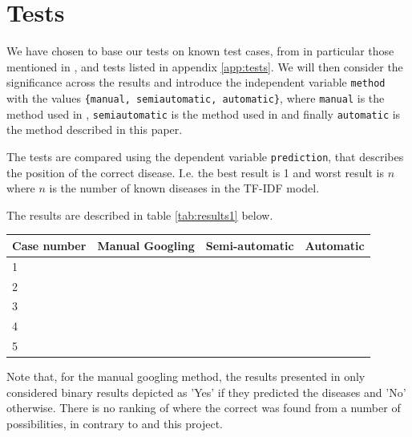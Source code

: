 \documentclass[10pt,letterpaper,final]{article}
\begin{document}


\section{Tests}
We have chosen to base our tests on known test cases, from in particular
those mentioned in \cite{jensenandersen}, \cite{googlingdiagnosis} and
tests listed in appendix \ref{app:tests}. We will then consider the
significance across the results and introduce the independent variable
\texttt{method} with the values \texttt{\{manual, semiautomatic,
automatic\}}, where \texttt{manual} is the method used in
\cite{googlingdiagnosis}, \texttt{semiautomatic} is the method used in
\cite{jensenandersen} and finally \texttt{automatic} is the method
described in this paper.

The tests are compared using the dependent variable \texttt{prediction},
that describes the position of the correct disease. I.e. the best result
is 1 and worst result is $n$ where $n$ is the number of known diseases
in the TF-IDF model.

The results are described in table \ref{tab:results1} below.
\begin{center}
	\begin{tabular}{llll}
		Case number & Manual Googling & Semi-automatic & Automatic \\ \hline
		1 &  &  &  \\
		2 &  &  &  \\
		3 &  &  &  \\
		4 &  &  &  \\
		5 &  &  &  \\
	\end{tabular}
	\label{tab:results1}
\end{center}
Note that, for the manual googling method, the results presented in
\cite{googlingdiagnosis} only considered binary results depicted as
'Yes' if they predicted the diseases and 'No' otherwise. There is no
ranking of where the correct was found from a number of possibilities,
in contrary to \cite{jensenandersen} and this project.

\end{document}
